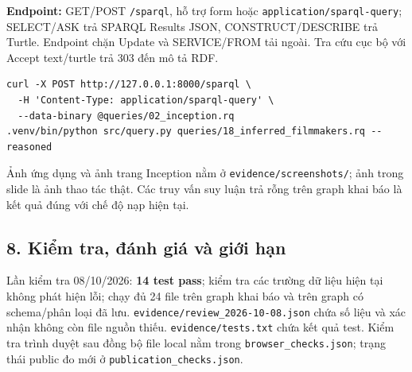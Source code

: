 \documentclass[
  11pt,
]{article}
\begin{document}
\textbf{Endpoint:} GET/POST \texttt{/\allowbreak{}sparql}, hỗ trợ form
hoặc
\texttt{applicat\allowbreak{}ion/\allowbreak{}spar\allowbreak{}ql-\allowbreak{}query\allowbreak{}};
SELECT/ASK trả SPARQL Results JSON,
C\allowbreak{}O\allowbreak{}N\allowbreak{}S\allowbreak{}T\allowbreak{}R\allowbreak{}U\allowbreak{}C\allowbreak{}\allowbreak{}T/\allowbreak{}\allowbreak{}D\allowbreak{}E\allowbreak{}S\allowbreak{}C\allowbreak{}R\allowbreak{}I\allowbreak{}\allowbreak{}B\allowbreak{}E
trả Turtle. Endpoint chặn Update và SERVICE/FROM tải ngoài. Tra cứu cục
bộ với Accept text/turtle trả 303 đến mô tả RDF.

\begin{verbatim}
curl -X POST http://127.0.0.1:8000/sparql \
  -H 'Content-Type: application/sparql-query' \
  --data-binary @queries/02_inception.rq
.venv/bin/python src/query.py queries/18_inferred_filmmakers.rq --reasoned
\end{verbatim}

Ảnh ứng dụng và ảnh trang Inception nằm ở
\texttt{evidence\allowbreak{}/\allowbreak{}screens\allowbreak{}hots/\allowbreak{}};
ảnh trong slide là ảnh thao tác thật. Các truy vấn suy luận trả rỗng
trên graph khai báo là kết quả đúng với chế độ nạp hiện tại.

\newpage

\subsection{8. Kiểm tra, đánh giá và giới
hạn}\label{kiux1ec3m-tra-ux111uxe1nh-giuxe1-vuxe0-giux1edbi-hux1ea1n}

Lần kiểm tra 08/10/2026: \textbf{14 test pass}; kiểm tra các trường dữ
liệu hiện tại không phát hiện lỗi; chạy đủ 24 file trên graph khai báo
và trên graph có schema/phân loại đã lưu.
\texttt{evidence\allowbreak{}/\allowbreak{}review\_\allowbreak{}2026-\allowbreak{}10-\allowbreak{}08.\allowbreak{}json}
chứa số liệu và xác nhận không còn file nguồn thiếu.
\texttt{evidence\allowbreak{}/\allowbreak{}tests.\allowbreak{}t\allowbreak{}xt}
chứa kết quả test. Kiểm tra trình duyệt sau đồng bộ file local nằm trong
\texttt{browser\_\allowbreak{}checks.\allowbreak{}j\allowbreak{}son};
trạng thái public đo mới ở
\texttt{publicat\allowbreak{}ion\_\allowbreak{}chec\allowbreak{}ks.\allowbreak{}json}.
\end{document}
